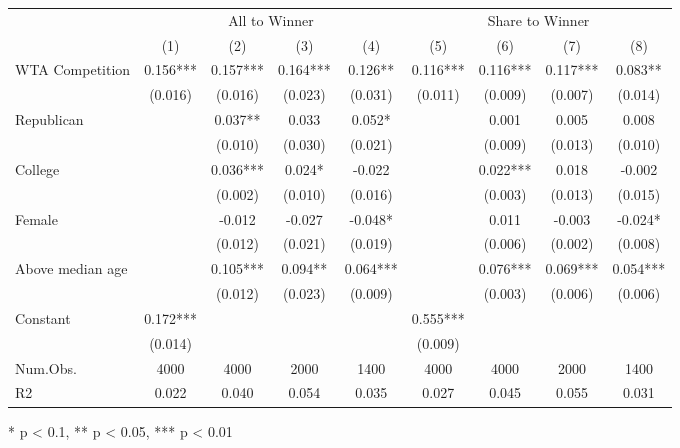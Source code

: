 \begin{table}[t]
\fontsize{12.0pt}{14.4pt}\selectfont
\begin{tabular*}{\linewidth}{@{\extracolsep{\fill}}lcccccccc}
\toprule
 & \multicolumn{4}{c}{All to Winner} & \multicolumn{4}{c}{Share to Winner} \\ 
\cmidrule(lr){2-5} \cmidrule(lr){6-9}
  & (1) & (2) & (3) & (4) & (5) & (6) & (7) & (8) \\ 
\midrule\addlinespace[2.5pt]
WTA Competition & 0.156*** & 0.157*** & 0.164*** & 0.126** & 0.116*** & 0.116*** & 0.117*** & 0.083** \\ 
 & (0.016) & (0.016) & (0.023) & (0.031) & (0.011) & (0.009) & (0.007) & (0.014) \\ 
Republican &  & 0.037** & 0.033 & 0.052* &  & 0.001 & 0.005 & 0.008 \\ 
 &  & (0.010) & (0.030) & (0.021) &  & (0.009) & (0.013) & (0.010) \\ 
College &  & 0.036*** & 0.024* & -0.022 &  & 0.022*** & 0.018 & -0.002 \\ 
 &  & (0.002) & (0.010) & (0.016) &  & (0.003) & (0.013) & (0.015) \\ 
Female &  & -0.012 & -0.027 & -0.048* &  & 0.011 & -0.003 & -0.024* \\ 
 &  & (0.012) & (0.021) & (0.019) &  & (0.006) & (0.002) & (0.008) \\ 
Above median age &  & 0.105*** & 0.094** & 0.064*** &  & 0.076*** & 0.069*** & 0.054*** \\ 
 &  & (0.012) & (0.023) & (0.009) &  & (0.003) & (0.006) & (0.006) \\ 
Constant & 0.172*** &  &  &  & 0.555*** &  &  &  \\ 
{} & {(0.014)} & {} & {} & {} & {(0.009)} & {} & {} & {} \\ 
Num.Obs. & 4000 & 4000 & 2000 & 1400 & 4000 & 4000 & 2000 & 1400 \\ 
R2 & 0.022 & 0.040 & 0.054 & 0.035 & 0.027 & 0.045 & 0.055 & 0.031 \\ 
\bottomrule
\end{tabular*}
\begin{minipage}{\linewidth}
* p < 0.1, ** p < 0.05, *** p < 0.01\\
\end{minipage}
\end{table}

